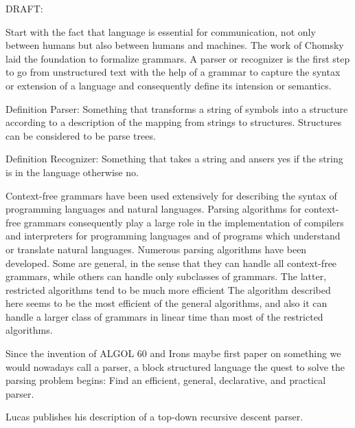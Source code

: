 %
\begin{isabellebody}%
%
%
\isadelimtheory
%
\endisadelimtheory
%
\isatagtheory
%
\endisatagtheory
{\isafoldtheory}%
%
\isadelimtheory
%
\endisadelimtheory
%
\isadelimdocument
%
\endisadelimdocument
%
\isatagdocument
%
\isamarkuptrue%
%
\endisatagdocument
{\isafolddocument}%
%
\isadelimdocument
%
\endisadelimdocument
%
\begin{isamarkuptext}%
DRAFT:

Start with the fact that language is essential for communication, not only between humans but also
between humans and machines. The work of Chomsky \cite{Chomsky:1956} laid the foundation to formalize grammars. A parser or recognizer
is the first step to go from unstructured text with the help of a grammar to capture the syntax or extension
of a language and consequently define its intension or semantics.

Definition Parser: Something that transforms a string of symbols into a structure according to a description
  of the mapping from strings to structures. Structures can be considered to be parse trees.

Definition Recognizer: Something that takes a string and ansers yes if the string is in the language
  otherwise no.

Context-free grammars have been used extensively for describing the syntax of programming languages
and natural languages. Parsing algorithms for context-free grammars consequently play a large role in
the implementation of compilers and interpreters for programming languages and of programs which understand
or translate natural languages. Numerous parsing algorithms have been developed. Some are general,
in the sense that they can handle all context-free grammars, while others can handle only subclasses of
grammars. The latter, restricted algorithms tend to be much more efficient The algorithm described here
seems to be the most efficient of the general algorithms, and also it can handle a larger class of grammars
in linear time than most of the restricted algorithms.

Since the invention of ALGOL 60 \cite{Backus:1963} and Irons \cite{Irons:1961} maybe first paper on
something we would nowadays call a parser, a block structured language the quest to solve the parsing problem begins:
Find an efficient, general, declarative, and practical parser.

Lucas \cite{Lucas:1961} publishes his description of a top-down recursive descent parser.


\end{isamarkuptext}
\end{isabellebody}
